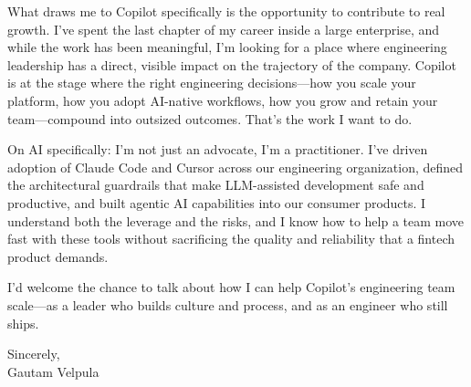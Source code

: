 \documentclass[11pt]{article}
\begin{document}
What draws me to Copilot specifically is the opportunity to contribute to real growth. I've spent the last chapter of my career inside a large enterprise, and while the work has been meaningful, I'm looking for a place where engineering leadership has a direct, visible impact on the trajectory of the company. Copilot is at the stage where the right engineering decisions---how you scale your platform, how you adopt AI-native workflows, how you grow and retain your team---compound into outsized outcomes. That's the work I want to do.

On AI specifically: I'm not just an advocate, I'm a practitioner. I've driven adoption of Claude Code and Cursor across our engineering organization, defined the architectural guardrails that make LLM-assisted development safe and productive, and built agentic AI capabilities into our consumer products. I understand both the leverage and the risks, and I know how to help a team move fast with these tools without sacrificing the quality and reliability that a fintech product demands.

I'd welcome the chance to talk about how I can help Copilot's engineering team scale---as a leader who builds culture and process, and as an engineer who still ships.

\vspace{16pt}

Sincerely, \\
Gautam Velpula
\end{document}
